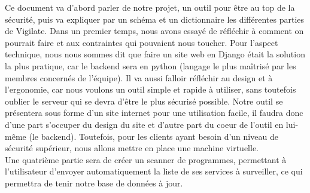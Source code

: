 Ce document va d'abord parler de notre projet, un outil pour être au top de la sécurité, puis va expliquer par un schéma et un dictionnaire les différentes parties de Vigilate. Dans un premier temps, nous avons essayé de réfléchir à comment on pourrait faire et aux contraintes qui pouvaient nous toucher. Pour l'aspect technique, nous nous sommes dit que faire un site web en Django était la solution la plus pratique, car le backend sera en python (langage le plus maîtrisé par les membres concernés de l'équipe). Il va aussi falloir réfléchir au design et à l'ergonomie, car nous voulons un outil simple et rapide à utiliser, sans toutefois oublier le serveur qui se devra d'être le plus sécurisé possible. Notre outil se présentera sous forme d'un site internet pour une utilisation facile, il faudra donc d'une part s'occuper du design du site et d'autre part du coeur de l'outil en lui-même (le backend). Toutefois, pour les clients ayant besoin d'un niveau de sécurité supérieur, nous allons mettre en place une machine virtuelle.\\
Une quatrième partie sera de créer un scanner de programmes, permettant à l'utilisateur d'envoyer automatiquement la liste de ses services à surveiller, ce qui permettra de tenir notre base de données à jour.\\